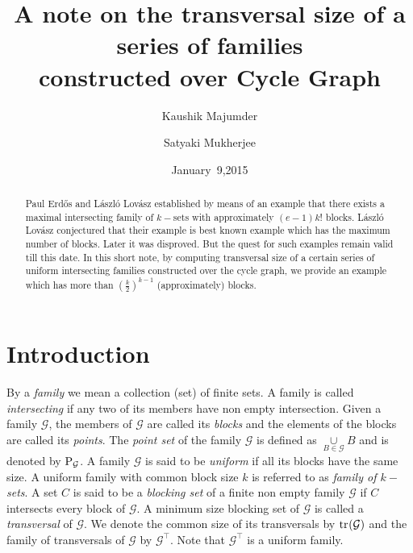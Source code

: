 \documentclass[a4paper,reqno,10pt]{amsart}
\title[Transversal size of a series of families constructed over Cycle Graph]{\textnormal{A note on the transversal size of a series of families\\ constructed over Cycle Graph}}
\author{Kaushik Majumder}
\author{Satyaki Mukherjee}
\date{January~9,2015}
\theoremstyle{definition}
\begin{document}
\begin{abstract}
Paul Erd\H{o}s and L\'{a}szl\'{o} Lov\'{a}sz established by means of an example that there exists a maximal intersecting family of $k-$sets with approximately $(e-1)k!$ blocks. L\'{a}szl\'{o} Lov\'{a}sz conjectured that their example is best known example which has the maximum number of blocks. Later it was disproved. But the quest for such examples remain valid till this date. In this short note, by computing transversal size of a certain series of uniform intersecting families constructed over the cycle graph, we provide an example which has more than $(\frac{k}{2})^{k-1}$ (approximately) blocks.   
\end{abstract}

\maketitle

\section{Introduction}

By a \emph{family} we mean a collection (set) of finite sets. A family is called \emph{intersecting} if any two of its members have non empty intersection. Given a family $\mathcal{G}$, the members of $\mathcal{G}$ are called its \emph{blocks} and the elements of the blocks are called its \emph{points}. The \emph{point set} of the family $\mathcal{G}$ is defined as $\underset{B\in\mathcal{G}}{\cup} B$ and is denoted by ${\ensuremath{{\textnormal{P}}}}_{\mathcal{G}}$. A family $\mathcal{G}$ is said to be \emph{uniform} if all its blocks have the same size. A uniform family with common block size $k$ is referred to as \emph{family of $k-$sets}. A set $C$ is said to be a \emph{blocking set} of a finite non empty family $\mathcal{G}$ if $C$ intersects every block of $\mathcal{G}$. A minimum size blocking set of $\mathcal{G}$ is called a \emph{transversal} of $\mathcal{G}$. We denote the common size of its transversals by ${\ensuremath{{\textnormal{tr}}_{}({\mathcal{G}})}}$ and the family of transversals of $\mathcal{G}$ by $\mathcal{G}^{\top}$. Note that $\mathcal{G}^{\top}
$ is a uniform family.
\end{document}
